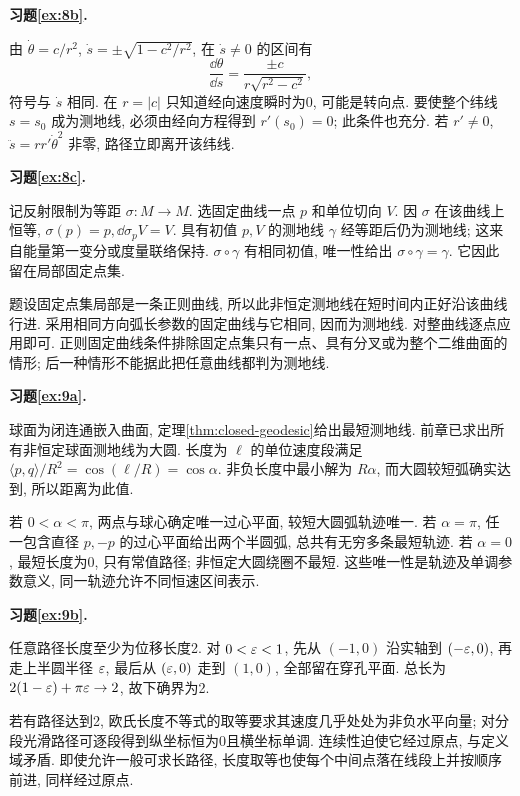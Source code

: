 \par{}
\noindent\textbf{习题\ref{ex:8b}.}
\begin{solution}
由 $\dot\theta=c/r^2$, $\dot s=\pm\sqrt{1-c^2/r^2}$, 在 $\dot s\ne0$ 的区间有
\[
 \frac{\dd\theta}{\dd s}=\frac{\pm c}{r\sqrt{r^2-c^2}},
\]
符号与 $\dot s$ 相同. 在 $r=|c|$ 只知道经向速度瞬时为0, 可能是转向点. 要使整个纬线 $s=s_0$ 成为测地线, 必须由经向方程得到 $r'(s_0)=0$; 此条件也充分. 若 $r'\ne0$, $\ddot s=rr'\dot\theta^2$ 非零, 路径立即离开该纬线.
\end{solution}
\par{}
\noindent\textbf{习题\ref{ex:8c}.}
\begin{solution}
记反射限制为等距 $\sigma:M\to M$. 选固定曲线一点 $p$ 和单位切向 $V$. 因 $\sigma$ 在该曲线上恒等, $\sigma(p)=p,\dd\sigma_pV=V$. 具有初值 $p,V$ 的测地线 $\gamma$ 经等距后仍为测地线; 这来自能量第一变分或度量联络保持. $\sigma\circ\gamma$ 有相同初值, 唯一性给出 $\sigma\circ\gamma=\gamma$. 它因此留在局部固定点集.

题设固定点集局部是一条正则曲线, 所以此非恒定测地线在短时间内正好沿该曲线行进. 采用相同方向弧长参数的固定曲线与它相同, 因而为测地线. 对整曲线逐点应用即可. 正则固定曲线条件排除固定点集只有一点、具有分叉或为整个二维曲面的情形; 后一种情形不能据此把任意曲线都判为测地线.
\end{solution}
\par{}
\par{}
\noindent\textbf{习题\ref{ex:9a}.}
\begin{solution}
球面为闭连通嵌入曲面, 定理\ref{thm:closed-geodesic}给出最短测地线. 前章已求出所有非恒定球面测地线为大圆. 长度为 $\ell$ 的单位速度段满足 $\langle p,q\rangle/R^2=\cos(\ell/R)=\cos\alpha$. 非负长度中最小解为 $R\alpha$, 而大圆较短弧确实达到, 所以距离为此值.

若 $0<\alpha<\pi$, 两点与球心确定唯一过心平面, 较短大圆弧轨迹唯一. 若 $\alpha=\pi$, 任一包含直径 $p,-p$ 的过心平面给出两个半圆弧, 总共有无穷多条最短轨迹. 若 $\alpha=0$, 最短长度为0, 只有常值路径; 非恒定大圆绕圈不最短. 这些唯一性是轨迹及单调参数意义, 同一轨迹允许不同恒速区间表示.
\end{solution}
\par{}
\noindent\textbf{习题\ref{ex:9b}.}
\begin{solution}
任意路径长度至少为位移长度2. 对 $0<\varepsilon<1$, 先从 $(-1,0)$ 沿实轴到 $(-\varepsilon,0)$, 再走上半圆半径 $\varepsilon$, 最后从 $(\varepsilon,0)$ 走到 $(1,0)$, 全部留在穿孔平面. 总长为 $2(1-\varepsilon)+\pi\varepsilon\to2$, 故下确界为2.

若有路径达到2, 欧氏长度不等式的取等要求其速度几乎处处为非负水平向量; 对分段光滑路径可逐段得到纵坐标恒为0且横坐标单调. 连续性迫使它经过原点, 与定义域矛盾. 即使允许一般可求长路径, 长度取等也使每个中间点落在线段上并按顺序前进, 同样经过原点.
\end{solution}

